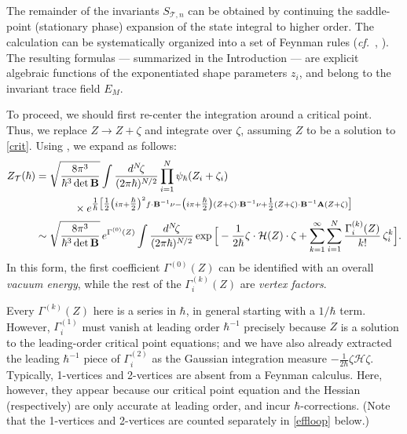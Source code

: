 \documentclass[12pt]{amsart}
\renewcommand{\eta}{\nu}
\theoremstyle{definition}
\def\hb{\hbar}
\newcommand{\CH}{\mathcal{H}}
\newcommand{\CT}{\mathcal{T}}
\newcommand{\cf}{\emph{cf.}}
\newcommand{\mb}{\mathbf}
\numberwithin{equation}{section}
\begin{document}
The remainder of the invariants $S_{\CT,n}$ can be obtained by continuing 
the saddle-point (stationary phase) expansion of the state integral to higher order. The 
calculation can be systematically organized into a set of Feynman rules 
(\cf\ \cite[Ch.9]{MirrorSym}, \cite{BIZ,Polyak}). The resulting formulas --- summarized in the Introduction --- are explicit 
algebraic functions of the exponentiated shape parameters $z_i$, and 
belong to the invariant trace field $E_M$.

To proceed, we should first re-center the integration around a 
critical point. Thus, we replace $Z\to Z+\zeta$ and 
integrate over $\zeta$, assuming $Z$ to be a solution to \eqref{crit}. 
Using \cite[Eqn.3.26]{DGLZ}, we expand as follows:
%
\begin{align} \notag
Z_{\CT}(\hbar) 
&=  \sqrt{\frac{8\pi^3}{\hbar^3\det\mb B}}\int 
\frac{d^N\! \zeta}{(2\pi\hbar)^{N/2}} \prod_{i=1}^N \psi_{\hb}(Z_i+\zeta_i) 
\\ &\hspace{.5in}\times 
e^{\tfrac1\hbar\big[ \tfrac1{2}\big(i\pi+\tfrac\hbar 2\big)^2f\cdot 
\mb B^{-1}\eta-\big(i\pi+\tfrac\hbar2\big)(Z+\zeta)\cdot\mb B^{-1}\eta
+\tfrac1{2}(Z+\zeta)\cdot\mb{B}^{-1}\mb A (Z+\zeta)\big]}
 \notag\\
&\sim \sqrt{\frac{8\pi^3}{\hbar^3\det\mb B}}\,e^{\Gamma^{(0)}(Z)}\int 
\frac{d^N\! \zeta}{(2\pi\hbar)^{N/2}}\exp\Big[-\frac{1}{2\hbar}
\zeta\cdot\CH(Z)\cdot \zeta+\sum_{k=1}^\infty\sum_{i=1}^N 
\frac{\Gamma^{(k)}_i(Z)}{k!}\,\zeta_i^k\Big].
\label{Feyngen}
\end{align}
%
In this form, the first coefficient $\Gamma^{(0)}(Z)$ can be identified with an overall \emph{vacuum energy}, while the rest of the $\Gamma_i^{(k)}(Z)$ are \emph{vertex factors}.


Every $\Gamma^{(k)}(Z)$ here is a series in $\hbar$, in general 
starting with a $1/\hbar$ term. However, $\Gamma_i^{(1)}$ must vanish 
at leading order $\hbar^{-1}$ precisely because $Z$ is a solution to 
the leading-order critical point equations; and we have also already 
extracted the leading $\hbar^{-1}$ piece of $\Gamma_i^{(2)}$ as the Gaussian 
integration measure $-\tfrac{1}{2\hbar}\zeta\CH\zeta$.
Typically, 1-vertices and 2-vertices are absent from a 
Feynman calculus. Here, however, they appear because our critical 
point equation and the Hessian (respectively) are only accurate at 
leading order, and incur $\hbar$-corrections. (Note that the 1-vertices and 2-vertices are counted separately in \eqref{effloop} below.)
\end{document}
